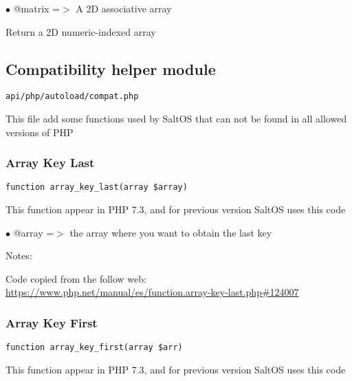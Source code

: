 \documentclass[a4paper]{article}
\def\htmladdnormallink#1#2{\href{#2}{#1}}
\begin{document}
\begin{compactitem}
\item[\color{myblue}$\bullet$] @matrix =$>$ A 2D associative array
\end{compactitem}

Return a 2D numeric-indexed array

\hypertarget{toc74}{}
\subsection{Compatibility helper module}

\begin{lstlisting}
api/php/autoload/compat.php
\end{lstlisting}

This file add some functions used by SaltOS that can not be found in all allowed versions of PHP

\hypertarget{toc75}{}
\subsubsection{Array Key Last}

\begin{lstlisting}
function array_key_last(array $array)
\end{lstlisting}

This function appear in PHP 7.3, and for previous version SaltOS
uses this code

\begin{compactitem}
\item[\color{myblue}$\bullet$] @array =$>$ the array where you want to obtain the last key
\end{compactitem}

Notes:

Code copied from the follow web:
\htmladdnormallink{https://www.php.net/manual/es/function.array-key-last.php\#124007}{https://www.php.net/manual/es/function.array-key-last.php\#124007}

\hypertarget{toc76}{}
\subsubsection{Array Key First}

\begin{lstlisting}
function array_key_first(array $arr)
\end{lstlisting}

This function appear in PHP 7.3, and for previous version SaltOS
uses this code
\end{document}
